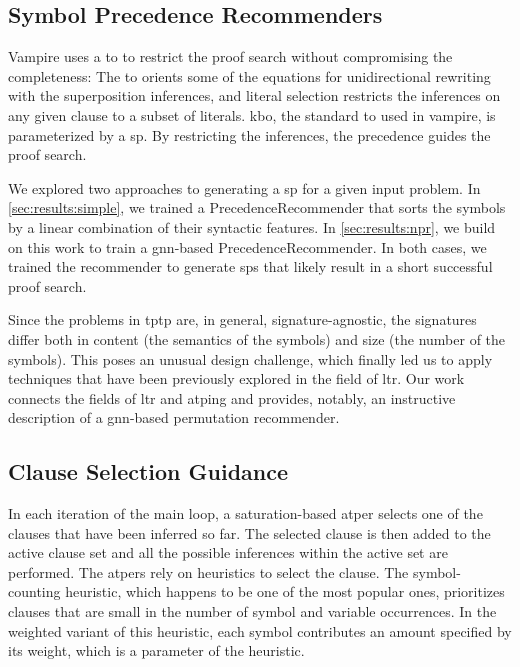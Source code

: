 \subsection{Symbol Precedence Recommenders}

Vampire uses a \gls{to} to restrict the proof search without compromising the completeness:
The \gls{to} orients some of the equations for unidirectional rewriting with the superposition inferences,
and literal selection restricts the inferences on any given clause to a subset of literals.
\Gls{kbo}, the standard \gls{to} used in \gls{vampire}, is parameterized by a \gls{sp}.
By restricting the inferences, the precedence guides the proof search.

We explored two approaches to generating a \gls{sp} for a given input problem.
In \cref{sec:results:simple}, we trained a \gls{PrecedenceRecommender} that sorts the symbols by a linear combination of their syntactic features.
In \cref{sec:results:npr}, we build on this work to train a \acrshort{gnn}-based \gls{PrecedenceRecommender}.
In both cases, we trained the recommender to generate \glspl{sp} that likely result in a short successful proof search.

Since the problems in \gls{tptp} are, in general, signature-agnostic,
the signatures differ both in content (the semantics of the symbols) and size (the number of the symbols).
This poses an unusual design challenge,
which finally led us to apply techniques that have been previously explored in the field of \gls{ltr}.
Our work connects the fields of \gls{ltr} and \gls{atping} and provides, notably, an instructive description of a \acrshort{gnn}-based permutation recommender.

\subsection{Clause Selection Guidance}

In each iteration of the main loop,
a saturation-based \gls{atper} selects one of the clauses that have been inferred so far.
The selected clause is then added to the active clause set and all the possible inferences within the active set are performed.
The \glspl{atper} rely on heuristics to select the clause.
The symbol-counting heuristic, which happens to be one of the most popular ones,
prioritizes clauses that are small in the number of symbol and variable occurrences.
In the weighted variant of this heuristic,
each symbol contributes an amount specified by its weight,
which is a parameter of the heuristic.

